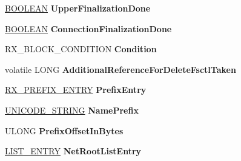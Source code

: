 \begin{DoxyCompactItemize}
\begin{tabbing}
\end{tabbing}\item 
\mbox{\label{struct___v___n_e_t___r_o_o_t_a433a31a39cd800284a09ea6ab4d82a3a}} 
\hyperlink{_processor_bind_8h_a112e3146cb38b6ee95e64d85842e380a}{B\+O\+O\+L\+E\+AN} {\bfseries Upper\+Finalization\+Done}
\item 
\mbox{\label{struct___v___n_e_t___r_o_o_t_a4b2a6f55e0267c08c110604bfe8a0387}} 
\hyperlink{_processor_bind_8h_a112e3146cb38b6ee95e64d85842e380a}{B\+O\+O\+L\+E\+AN} {\bfseries Connection\+Finalization\+Done}
\item 
\mbox{\label{struct___v___n_e_t___r_o_o_t_abb7866d2e33e808c64f3f5f96b19e740}} 
R\+X\+\_\+\+B\+L\+O\+C\+K\+\_\+\+C\+O\+N\+D\+I\+T\+I\+ON {\bfseries Condition}
\item 
\mbox{\label{struct___v___n_e_t___r_o_o_t_ab3b08faef755e81d82e6483d747cfeeb}} 
volatile L\+O\+NG {\bfseries Additional\+Reference\+For\+Delete\+Fsctl\+Taken}
\item 
\mbox{\label{struct___v___n_e_t___r_o_o_t_a7acbf48c7e312737ed3b9bda7544b824}} 
\hyperlink{struct___r_x___p_r_e_f_i_x___e_n_t_r_y}{R\+X\+\_\+\+P\+R\+E\+F\+I\+X\+\_\+\+E\+N\+T\+RY} {\bfseries Prefix\+Entry}
\item 
\mbox{\label{struct___v___n_e_t___r_o_o_t_a5e126ebc1ce5e3337921535f6e59cfdc}} 
\hyperlink{struct___u_n_i_c_o_d_e___s_t_r_i_n_g}{U\+N\+I\+C\+O\+D\+E\+\_\+\+S\+T\+R\+I\+NG} {\bfseries Name\+Prefix}
\item 
\mbox{\label{struct___v___n_e_t___r_o_o_t_a4fc3ffda27759a9a84e1b19b3a19bc2f}} 
U\+L\+O\+NG {\bfseries Prefix\+Offset\+In\+Bytes}
\item 
\mbox{\label{struct___v___n_e_t___r_o_o_t_a1051f1bc5001b09dcee30c76df1ddea7}} 
\hyperlink{struct___l_i_s_t___e_n_t_r_y}{L\+I\+S\+T\+\_\+\+E\+N\+T\+RY} {\bfseries Net\+Root\+List\+Entry}
\item 
\mbox{\label{struct___v___n_e_t___r_o_o_t_a0f28cfdb7b450d54d474a2a8a3d6ae05}} 

\end{DoxyCompactItemize}
